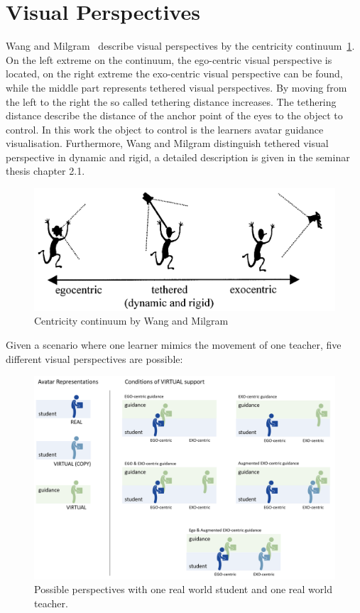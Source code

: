 \section{Visual Perspectives}
\label{section:visual_perspectives}
Wang and Milgram~\cite{centricitycontinuum} describe visual perspectives by the centricity continuum~\ref{fig:ego-exo-continuum}. On the left extreme on the continuum, the ego-centric visual perspective is located, on the right extreme the exo-centric visual perspective can be found, while the middle part represents tethered visual perspectives. By moving from the left to the right the so called tethering distance increases. The tethering distance describe the distance of the anchor point of the eyes to the object to control. In this work the object to control is the learners avatar guidance visualisation. Furthermore, Wang and Milgram distinguish tethered visual perspective in dynamic and rigid, a detailed description is given in the seminar thesis chapter 2.1. 
\begin{figure}[htb]
	\centering
	\includegraphics[width=\textwidth]{figures/ego_exo_continuum.PNG}
	\caption[Centricity continuum]{Centricity continuum by Wang and Milgram~\cite{centricitycontinuum}}
	\label{fig:ego-exo-continuum}
\end{figure}
Given a scenario where one learner mimics the movement of one teacher, five different visual perspectives are possible:
\begin{figure}[htb]
	\centering
	\includegraphics[width=\textwidth]{figures/perspectives.png}
	\caption[Possible perspectives]{Possible perspectives with one real world student and one real world teacher.}
	\label{fig:perspectives}
\end{figure}
